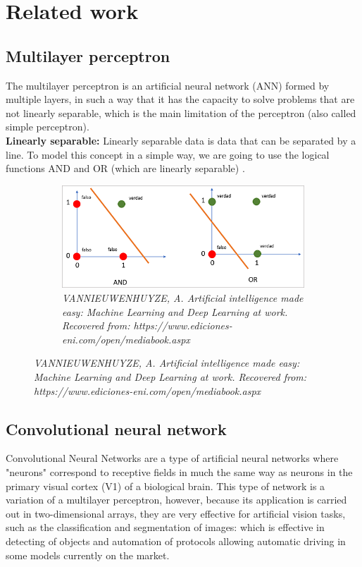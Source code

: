 \section{Related work}

\subsection{Multilayer perceptron}
The multilayer perceptron is an artificial neural network (ANN) formed by
multiple layers, in such a way that it has the capacity to solve problems that
are not linearly separable, which is the main limitation of the perceptron (also
called simple perceptron).\\

\textbf{Linearly separable:} Linearly separable data is data that can be
separated by a line. To model this concept in a simple way, we are going to use
the logical functions AND and OR (which are linearly separable)
\cite{perceptron}.

\begin{figure}[H]
    \centering
    \begin{subfigure}[b]{0.8\textwidth}
        \centering
        \includegraphics[width=\textwidth]{Figures/2. Related Work/perceptron.png}
        \caption{\textit{
                VANNIEUWENHUYZE, A. Artificial intelligence made easy: Machine
                Learning and Deep Learning at work. Recovered from:
                https://www.ediciones-eni.com/open/mediabook.aspx
            }}
    \end{subfigure}
\end{figure}

\subsection{Convolutional neural network}
Convolutional Neural Networks are a type of artificial neural networks where
"neurons" correspond to receptive fields in much the same way as neurons in the
primary visual cortex (V1) of a biological brain. This type of network is a
variation of a multilayer perceptron, however, because its application is
carried out in two-dimensional arrays, they are very effective for artificial
vision tasks, such as the classification and segmentation of images: which is
effective in detecting of objects and automation of protocols allowing automatic
driving in some models currently on the market.\\

